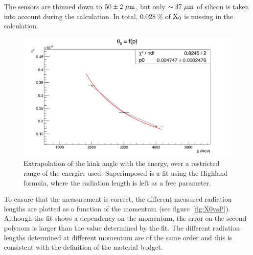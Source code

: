    The sensors are thinned down to $50 \pm 2~\rm{\mu m}$, but only $\sim 37~\rm{\mu m}$ of silicon is taken into account during the calculation.
   In total, $0.028~\%$ of $\rm{X_{0}}$ is missing in the calculation.
   
   \begin{figure}[!h]
     \centering
     \includegraphics[width = \textwidth]{Pictures/X0/theta0VsP_2-4GeV.png}
     \caption{Extrapolation of the kink angle with the energy, over a restricted range of the energies used.
     Superimposed is a fit using the Highland formula, where the radiation length is left as a free parameter.}
     \label{fig:theta0vsP_2-4}
   \end{figure}

   To ensure that the measurement is correct, the different measured radiation lengths are plotted as a function of the momentum (see figure~\ref{fig:X0vsP}).
   Although the fit shows a dependency on the momentum, the error on the second polynom is larger than the value determined by the fit.
   The different radiation lengths determined at different momentum are of the same order and this is consistent with the definition of the material budget.



